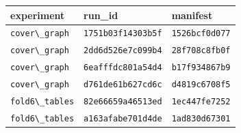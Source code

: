 \begin{tabular}{lll}%
\hline%
\textbf{experiment}&\textbf{run\_id}&\textbf{manifest}\\%
\hline%
\texttt{cover\textbackslash{}\_graph}&\texttt{1751b03f14303b5f}&\texttt{1526bcf0d077}\\%
\texttt{cover\textbackslash{}\_graph}&\texttt{2dd6d526e7c099b4}&\texttt{28f708c8fb0f}\\%
\texttt{cover\textbackslash{}\_graph}&\texttt{6eafffdc801a54d4}&\texttt{b17f934867b9}\\%
\texttt{cover\textbackslash{}\_graph}&\texttt{d761de61b627cd6c}&\texttt{d4819c6708f5}\\%
\texttt{fold6\textbackslash{}\_tables}&\texttt{82e66659a46513ed}&\texttt{1ec447fe7252}\\%
\texttt{fold6\textbackslash{}\_tables}&\texttt{a163afabe701d4de}&\texttt{1ad830d67301}\\%
\hline%
\end{tabular}
